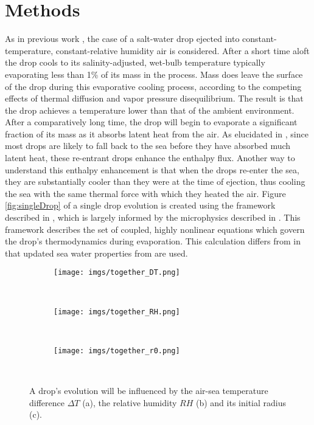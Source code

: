 \documentclass[10pt,a4paper]{article}
\begin{document}
\section{Methods}
As in previous work \citep{Andreas1990,Andreas2001}, the case of a salt-water drop ejected into constant-temperature, constant-relative humidity air is considered. After a short time aloft the drop cools to its salinity-adjusted, wet-bulb temperature typically evaporating less than 1\% of its mass in the process. Mass does leave the surface of the drop during this evaporative cooling process, according to the competing effects of thermal diffusion and vapor pressure disequilibrium. The result is that the drop achieves a temperature lower than that of the ambient environment. After a comparatively long time, the drop will begin to evaporate a significant fraction of its mass as it absorbs latent heat from the air. As elucidated in \citet{Andreas2001}, since most drops are likely to fall back to the sea before they have absorbed much latent heat, these re-entrant drops enhance the enthalpy flux. Another way to understand this enthalpy enhancement is that when the drops re-enter the sea, they are substantially cooler than they were at the time of ejection, thus cooling the sea with the same thermal force with which they heated the air. Figure \ref{fig:singleDrop} of a single drop evolution is created using the framework described in \citet{Andreas1990}, which is largely informed by the microphysics described in \citet{Pruppacher1978}. This framework describes the set of coupled, highly nonlinear equations which govern the drop's thermodynamics during evaporation. This calculation differs from \citet{Andreas1990} in that updated sea water properties from \citet{Nayar2016} are used. 
\begin{figure}[h!]
    \centering
   \hspace*{-0.5in} \begin{subfigure}[t!]{0.49\textwidth}
        \texttt{[image: imgs/together\_DT.png]} 
            \caption{\label{dDT}}       
    \end{subfigure}
    ~ %
    \begin{subfigure}[t!]{0.49\textwidth}
        \texttt{[image: imgs/together\_RH.png]}   
                    \caption{\label{dRH}}            
    \end{subfigure}
    ~ %
        \begin{subfigure}[t!]{0.7\textwidth}
        \texttt{[image: imgs/together\_r0.png]}
                    \caption{\label{dr0}}               
    \end{subfigure}
    ~ %
       \caption{A drop's evolution will be influenced by the air-sea temperature difference $\Delta T$ (a), the relative humidity $RH$ (b) and its initial radius (c). \label{fig:changeDTRHr0}}
\end{figure}
\end{document}
